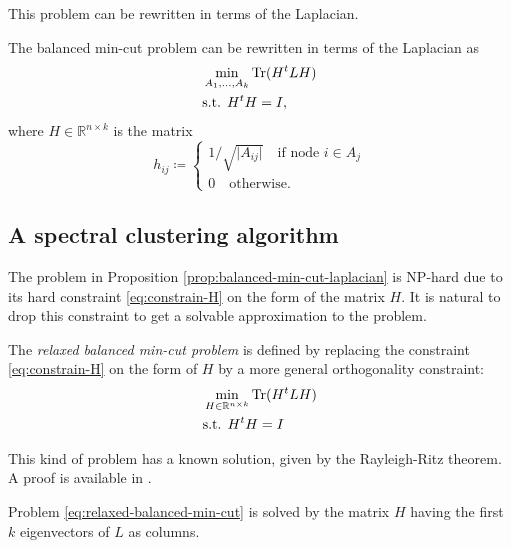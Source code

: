\documentclass[../../main.tex]{subfiles} %
\begin{document}
This problem can be rewritten in terms of the Laplacian.
\begin{proposition}  %
The balanced min-cut problem can be rewritten in terms of the Laplacian as
\begin{equation}
	\begin{aligned}
	    &\min_{A_1, \dots, A_k} \textup{Tr} (H^t L H) \\
	    &\text{s.t. } H^t H = I,
	\end{aligned}
	\label{eq:laplacian-balanced-min-cut}
\end{equation}
where \(H \in \mathbb R^{n \times k}\) is the matrix
\begin{equation}
	h_{ij} \coloneqq \begin{cases}
		1/\sqrt{\vert A_{ij} \vert} \quad \text{if node } i \in A_j \\
		0 \quad \text{otherwise.}  
	\end{cases}
\label{eq:constrain-H}
\end{equation}
\label{prop:balanced-min-cut-laplacian}
\end{proposition}

\subsection{A spectral clustering algorithm}
The problem in Proposition \ref{prop:balanced-min-cut-laplacian} is NP-hard 
due to its hard constraint \eqref{eq:constrain-H} on the form of the matrix 
\(H\). It is natural to drop this constraint to get a solvable approximation to the 
problem.
\begin{definition}  %
The \textit{relaxed balanced min-cut problem} is defined by replacing the 
constraint \eqref{eq:constrain-H} on the form of \(H\) by a more general 
orthogonality constraint:
	\begin{equation}
		\begin{aligned}
			&\min_{H \in \mathbb R^{n \times k}} \textup{Tr} (H^t L H) \\
			&\text{s.t. } H^t H = I
		\end{aligned}
		\label{eq:relaxed-balanced-min-cut}
	\end{equation}
\end{definition}
This kind of problem has a known solution, given by the Rayleigh-Ritz 
theorem. 
A proof is available in \cite{l1996handbook}.
\begin{proposition}
	Problem \eqref{eq:relaxed-balanced-min-cut} is solved by the matrix \(H\) 
	having the first \(k\) eigenvectors of \(L\) as columns.
\end{proposition}
\end{document}
